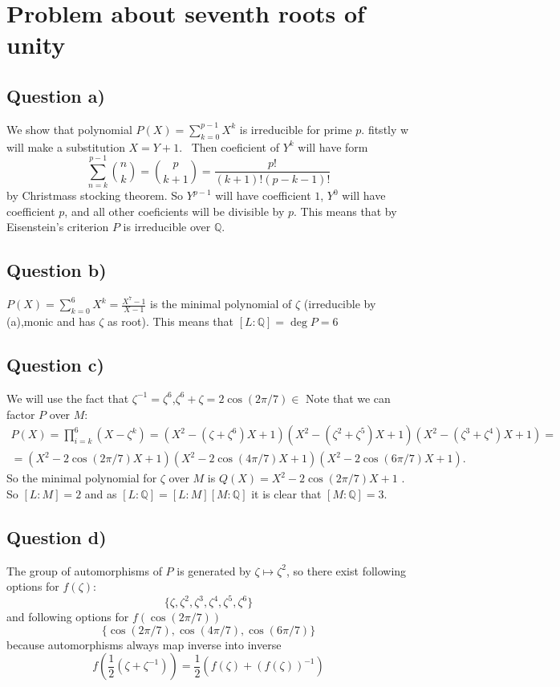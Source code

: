 \documentclass[12pt]{article}
\begin{document}
\section{Problem about seventh roots of unity}
\subsection*{Question a)}
We show that polynomial  $P(X) = \sum^{p-1}_{k=0} X^{k}$ is irreducible for prime $p$.
fitstly w will make a substitution $X = Y + 1$. \
Then coeficient of $Y^k$ will have form 
$$\sum^{p - 1}_{n = k} \binom {n}{k} = \binom {p}{k+ 1} = \frac{p!}{(k+1)!(p - k - 1)!} $$ 
by Christmass stocking theorem. So $Y^{p-1}$ will have coefficient $1$, $Y^0$ will have coefficient $p$,
 and all other coeficients will be divisible by $p$. 
This means that by Eisenstein's criterion $P$ is irreducible over $ \mathbb{Q}$.
\subsection*{Question b)}
 $P(X) = \sum^{6}_{k=0} X^k = \frac{X^7 - 1}{X - 1}  $  is the minimal polynomial of $\zeta$ (irreducible by (a),monic and has $\zeta$ as root). This means that $[L : \mathbb{Q}] = \deg P = 6  $ 
\subsection*{Question c)} 
We will use the fact that $\zeta^{-1} = \zeta^6 $,$\zeta^6 + \zeta = 2\cos(2\pi/7) \in $
  Note that we can factor $P$ over $M$:
  \begin{multline*}
   P(X) =  \prod^6_{i = k}( X - \zeta^k) = (X^2  - (\zeta + \zeta^6)X + 1)
   (X^2 - (\zeta^2 + \zeta^5)X + 1)(X^2 - (\zeta^3 + \zeta^4)X + 1) = \\=
   (X^2 - 2 \cos(2\pi/7)X + 1)
   (X^2 - 2 \cos(4\pi/7)X + 1)
   (X^2 - 2 \cos(6\pi/7)X + 1).
  \end{multline*}
  So the minimal polynomial for $\zeta$ over $M$ is $ Q(X) = X^2 - 2 \cos(2\pi/7)X + 1$ . 
  So $[L:M] = 2$ and  as $[L : \mathbb{Q}] = [L : M][M : \mathbb{Q}]$ it is clear that $[M : \mathbb{Q}] = 3$.
\subsection*{Question d)}
  The group of automorphisms of $P$ is generated by $\zeta \mapsto \zeta^2$, so there exist following options for $f(\zeta)$:
$$
 \{ \zeta, \zeta^2,\zeta^3,\zeta^4,\zeta^5,\zeta^6\}
$$ 
and following options for $f(\cos(2\pi/7))$
$$
\{ \cos(2\pi/7),\cos(4\pi/7) , \cos(6\pi/7)   \}
 $$
because automorphisms always map inverse into inverse
$$
  f \left( \frac{1}{2}(\zeta + \zeta^{-1})\right) =  \frac{1}{2}(f(\zeta) + (f(\zeta))^{-1})
$$
\end{document}
